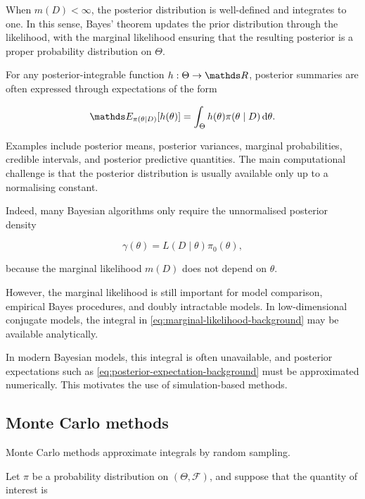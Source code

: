 When $m(D)<\infty$, the posterior distribution is well-defined and integrates to one.
In this sense, Bayes' theorem updates the prior distribution through the likelihood, with the marginal likelihood ensuring that the resulting posterior is a proper probability distribution on $\Theta$.

For any posterior-integrable function $h:\Theta\to\bR$, posterior summaries are often expressed through expectations of the form

\begin{equation}
    \bE_{\pi(\theta\mid D)}\qty[h(\theta)]
    =
    \int_{\Theta} h(\theta)\pi(\theta\mid D)\,\dd\theta.
    \label{eq:posterior-expectation-background}
\end{equation}

Examples include posterior means, posterior variances, marginal probabilities, credible intervals, and posterior predictive quantities.
The main computational challenge is that the posterior distribution is usually available only up to a normalising constant.

Indeed, many Bayesian algorithms only require the unnormalised posterior density

\begin{equation}
    \gamma(\theta)
    =
    L(D\mid\theta)\pi_0(\theta),
    \label{eq:unnormalised-posterior-background}
\end{equation}

because the marginal likelihood $m(D)$ does not depend on $\theta$.

However, the marginal likelihood is still important for model comparison, empirical Bayes procedures, and doubly intractable models.
In low-dimensional conjugate models, the integral in \eqref{eq:marginal-likelihood-background} may be available analytically.

In modern Bayesian models, this integral is often unavailable, and posterior expectations such as \eqref{eq:posterior-expectation-background} must be approximated numerically.
This motivates the use of simulation-based methods.

\subsection{Monte Carlo methods}

Monte Carlo methods approximate integrals by random sampling.

Let $\pi$ be a probability distribution on $(\Theta,\mathcal{F})$, and suppose that the quantity of interest is

